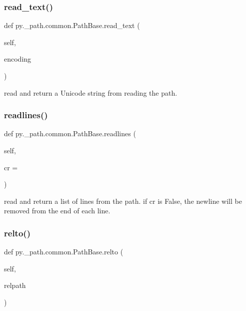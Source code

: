 \subsubsection{\texorpdfstring{read\+\_\+text()}{read\_text()}}
{\footnotesize\ttfamily def py.\+\_\+path.\+common.\+Path\+Base.\+read\+\_\+text (\begin{DoxyParamCaption}\item[{}]{self,  }\item[{}]{encoding }\end{DoxyParamCaption})}

\begin{DoxyVerb}read and return a Unicode string from reading the path. \end{DoxyVerb}
 \mbox{\label{classpy_1_1__path_1_1common_1_1_path_base_a5fb6556781558ab4c7cc7c64d28959a6}} 
\subsubsection{\texorpdfstring{readlines()}{readlines()}}
{\footnotesize\ttfamily def py.\+\_\+path.\+common.\+Path\+Base.\+readlines (\begin{DoxyParamCaption}\item[{}]{self,  }\item[{}]{cr = {} }\end{DoxyParamCaption})}

\begin{DoxyVerb}read and return a list of lines from the path. if cr is False, the
newline will be removed from the end of each line. \end{DoxyVerb}
 \mbox{\label{classpy_1_1__path_1_1common_1_1_path_base_a0ce740f9f787fca8752c06339fd559c0}} 
\subsubsection{\texorpdfstring{relto()}{relto()}}
{\footnotesize\ttfamily def py.\+\_\+path.\+common.\+Path\+Base.\+relto (\begin{DoxyParamCaption}\item[{}]{self,  }\item[{}]{relpath }\end{DoxyParamCaption})}

